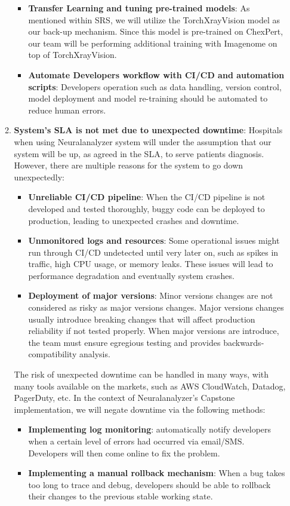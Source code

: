 \documentclass{article}
\begin{document}
\begin{enumerate}
\begin{enumerate}
\begin{itemize}
            \item \textbf{Transfer Learning and tuning pre-trained models}: As mentioned within SRS, we will utilize the TorchXrayVision model as our back-up mechanism. Since this model is pre-trained on ChexPert, our team will be performing additional training with Imagenome on top of TorchXrayVision.
            \item \textbf{Automate Developers workflow with CI/CD and automation scripts}: Developers operation such as data handling, version control, model deployment and model re-training should be automated to reduce human errors.
        \end{itemize}
        
        
        \item \textbf{System's SLA is not met due to unexpected downtime}: Hospitals when using Neuralanalyzer system will under the assumption that our system will be up, as agreed in the SLA, to serve patients diagnosis. However, there are multiple reasons for the system to go down unexpectedly:
        \begin{itemize}
            \item \textbf{Unreliable CI/CD pipeline}: When the CI/CD pipeline is not developed and tested thoroughly, buggy code can be deployed to production, leading to unexpected crashes and downtime.
            \item \textbf{Unmonitored logs and resources}: Some operational issues might run through CI/CD undetected until very later on, such as spikes in traffic, high CPU usage, or memory leaks. These issues will lead to performance degradation and eventually system crashes.
            \item \textbf{Deployment of major versions}: Minor versions changes are not considered as risky as major versions changes. Major versions changes usually introduce breaking changes that will affect production reliability if not tested properly. When major versions are introduce, the team must ensure egregious testing and provides backwards-compatibility analysis.
        \end{itemize}
        The risk of unexpected downtime can be handled in many ways, with many tools available on the markets, such as AWS CloudWatch, Datadog, PagerDuty, etc. In the context of Neuralanalyzer's Capstone implementation, we will negate downtime via the following methods:
        \begin{itemize}
            \item \textbf{Implementing log monitoring}: automatically notify developers when a certain level of errors had occurred via email/SMS. Developers will then come online to fix the problem.
            \item \textbf{Implementing a manual rollback mechanism}: When a bug takes too long to trace and debug, developers should be able to rollback their changes to the previous stable working state.
        \end{itemize}
    \end{enumerate}

\end{enumerate}
\end{document}
